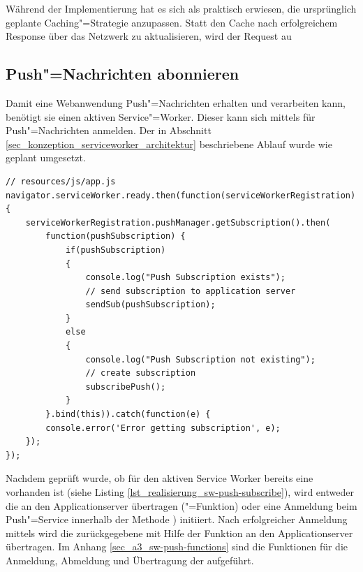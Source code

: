 Während der Implementierung hat es sich als praktisch erwiesen, die ursprünglich geplante Caching"=Strategie anzupassen. Statt den Cache nach erfolgreichem Response über das Netzwerk zu aktualisieren, wird der Request au 

\newpage
\subsection{Push"=Nachrichten abonnieren}

Damit eine Webanwendung Push"=Nachrichten erhalten und verarbeiten kann, benötigt sie einen aktiven Service"=Worker. Dieser kann sich mittels  für Push"=Nachrichten anmelden. Der in Abschnitt \ref{sec_konzeption_serviceworker_architektur} beschriebene Ablauf wurde wie geplant umgesetzt. \\

\begin{lstlisting}[caption={Service Worker: Anmeldung am Push"=Server},label={lst_realisierung_sw-push-subscribe}, frame=single]
// resources/js/app.js
navigator.serviceWorker.ready.then(function(serviceWorkerRegistration) {
    serviceWorkerRegistration.pushManager.getSubscription().then(
        function(pushSubscription) {
            if(pushSubscription)
            {
                console.log("Push Subscription exists");
                // send subscription to application server
                sendSub(pushSubscription);
            }
            else
            {
                console.log("Push Subscription not existing");
                // create subscription
                subscribePush();
            }
        }.bind(this)).catch(function(e) {
        console.error('Error getting subscription', e);
    });
});
\end{lstlisting}

Nachdem geprüft wurde, ob für den aktiven Service Worker bereits eine  vorhanden ist (siehe Listing \ref{lst_realisierung_sw-push-subscribe}), wird entweder die  an den Applicationserver übertragen ("=Funktion) oder eine Anmeldung beim Push"=Service innerhalb der Methode ) initiiert. 
Nach erfolgreicher Anmeldung mittels  wird die zurückgegebene  mit Hilfe der Funktion  an den Applicationserver übertragen. Im Anhang \ref{sec_a3_sw-push-functions} sind die Funktionen für die Anmeldung, Abmeldung und Übertragung der  aufgeführt.

